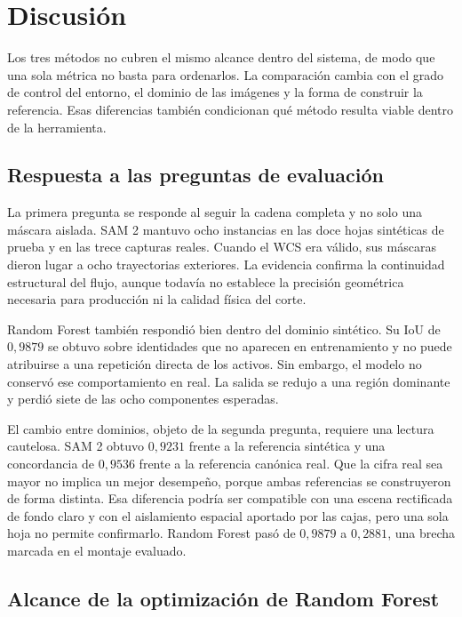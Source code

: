 \chapter{Discusión}
\label{cap:discusion}

Los tres métodos no cubren el mismo alcance dentro del sistema, de modo que una sola métrica no basta para ordenarlos. La comparación cambia con el grado de control del entorno, el dominio de las imágenes y la forma de construir la referencia. Esas diferencias también condicionan qué método resulta viable dentro de la herramienta.

\section{Respuesta a las preguntas de evaluación}

La primera pregunta se responde al seguir la cadena completa y no solo una máscara aislada. SAM 2 mantuvo ocho instancias en las doce hojas sintéticas de prueba y en las trece capturas reales. Cuando el WCS era válido, sus máscaras dieron lugar a ocho trayectorias exteriores. La evidencia confirma la continuidad estructural del flujo, aunque todavía no establece la precisión geométrica necesaria para producción ni la calidad física del corte.

Random Forest también respondió bien dentro del dominio sintético. Su IoU de $0{,}9879$ se obtuvo sobre identidades que no aparecen en entrenamiento y no puede atribuirse a una repetición directa de los activos. Sin embargo, el modelo no conservó ese comportamiento en real. La salida se redujo a una región dominante y perdió siete de las ocho componentes esperadas.

El cambio entre dominios, objeto de la segunda pregunta, requiere una lectura cautelosa. SAM 2 obtuvo $0{,}9231$ frente a la referencia sintética y una concordancia de $0{,}9536$ frente a la referencia canónica real. Que la cifra real sea mayor no implica un mejor desempeño, porque ambas referencias se construyeron de forma distinta. Esa diferencia podría ser compatible con una escena rectificada de fondo claro y con el aislamiento espacial aportado por las cajas, pero una sola hoja no permite confirmarlo. Random Forest pasó de $0{,}9879$ a $0{,}2881$, una brecha marcada en el montaje evaluado.

\section{Alcance de la optimización de Random Forest}

